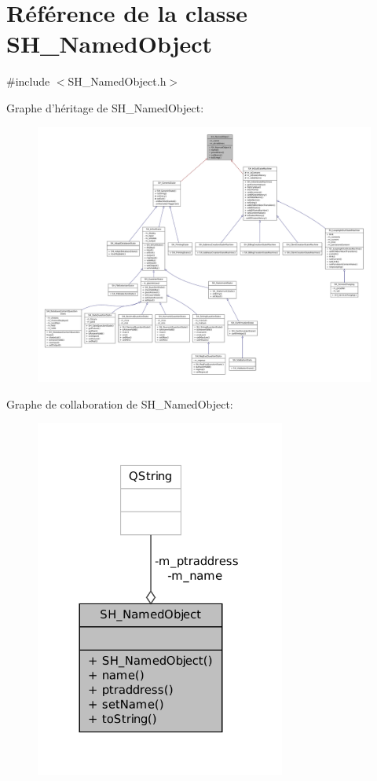 \hypertarget{classSH__NamedObject}{\section{Référence de la classe S\-H\-\_\-\-Named\-Object}
\label{classSH__NamedObject}
}


{\ttfamily \#include $<$S\-H\-\_\-\-Named\-Object.\-h$>$}



Graphe d'héritage de S\-H\-\_\-\-Named\-Object\-:
\nopagebreak
\begin{figure}[H]
\begin{center}
\leavevmode
\includegraphics[width=350pt]{classSH__NamedObject__inherit__graph}
\end{center}
\end{figure}


Graphe de collaboration de S\-H\-\_\-\-Named\-Object\-:
\nopagebreak
\begin{figure}[H]
\begin{center}
\leavevmode
\includegraphics[width=233pt]{classSH__NamedObject__coll__graph}
\end{center}
\end{figure}
